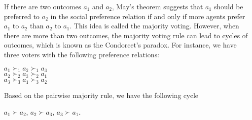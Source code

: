 If there are two outcomes $a_1$ and $a_2$,
May's theorem \cite{May52} suggests that $a_1$ should be
preferred to $a_2$ in the social preference relation
if and only if more agents prefer $a_1$ to $a_2$ than
$a_2$ to $a_1$.
This idea is called the majority voting.
However, when there are more than two outcomes,
the majority voting rule can lead to cycles of
outcomes, which is known as the Condorcet's paradox.
For instance, we have three voters with the following
preference relations:
\begin{center}
	$a_1 \succ_1 a_2 \succ_1 a_3$\\
	$a_2 \succ_2 a_3 \succ_2 a_1$\\
	$a_3 \succ_3 a_1 \succ_3 a_2$
\end{center}
Based on the pairwise majority rule, we have the following cycle
\begin{center}
	$a_1 \succ a_2$, $a_2 \succ a_3$, $a_3 \succ a_1$. 
\end{center}

%
%

